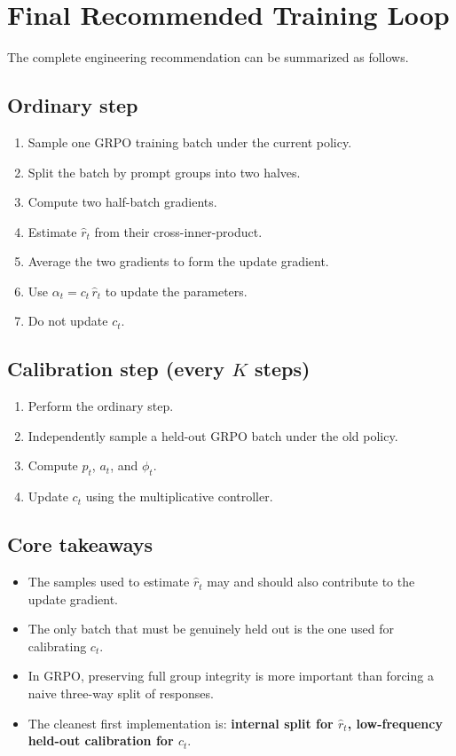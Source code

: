 \documentclass[11pt,a4paper]{article}
\newcommand{\rhat}{\hat r_t}
\newcommand{\phit}{\phi_t}
\begin{document}
\section{Final Recommended Training Loop}
The complete engineering recommendation can be summarized as follows.

\subsection*{Ordinary step}
\begin{enumerate}[label=\arabic*., leftmargin=2em]
    \item Sample one GRPO training batch under the current policy.
    \item Split the batch by prompt groups into two halves.
    \item Compute two half-batch gradients.
    \item Estimate $\rhat$ from their cross-inner-product.
    \item Average the two gradients to form the update gradient.
    \item Use $\alpha_t = c_t\,\rhat$ to update the parameters.
    \item Do not update $c_t$.
\end{enumerate}

\subsection*{Calibration step (every $K$ steps)}
\begin{enumerate}[label=\arabic*., leftmargin=2em]
    \item Perform the ordinary step.
    \item Independently sample a held-out GRPO batch under the old policy.
    \item Compute $p_t$, $a_t$, and $\phit$.
    \item Update $c_t$ using the multiplicative controller.
\end{enumerate}

\subsection*{Core takeaways}
\begin{itemize}[leftmargin=2em]
    \item The samples used to estimate $\rhat$ may and should also contribute to the update gradient.
    \item The only batch that must be genuinely held out is the one used for calibrating $c_t$.
    \item In GRPO, preserving full group integrity is more important than forcing a naive three-way split of responses.
    \item The cleanest first implementation is: \textbf{internal split for $\rhat$, low-frequency held-out calibration for $c_t$}. 
\end{itemize}
\end{document}
